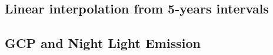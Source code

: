 \documentclass[a4paper]{article}
\begin{document}
\subsection{Linear interpolation from 5-years intervals}\label{interpolation}

\subsection{GCP and Night Light Emission}\label{GCP_corr}

\end{document}
